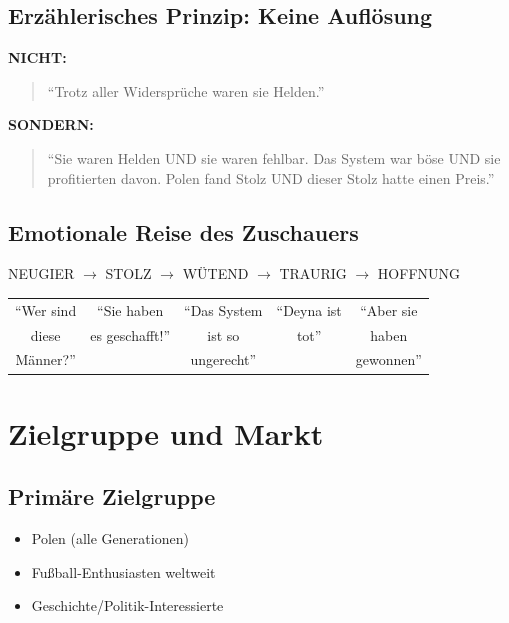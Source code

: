 \documentclass[11pt,a4paper]{book}
\begin{document}
\section{Erzählerisches Prinzip: Keine Auflösung}

\textbf{NICHT:}
\begin{quote}
``Trotz aller Widersprüche waren sie Helden.''
\end{quote}

\textbf{SONDERN:}
\begin{quote}
``Sie waren Helden UND sie waren fehlbar. Das System war böse UND sie profitierten davon. Polen fand Stolz UND dieser Stolz hatte einen Preis.''
\end{quote}

\section{Emotionale Reise des Zuschauers}

\begin{center}
NEUGIER $\rightarrow$ STOLZ $\rightarrow$ WÜTEND $\rightarrow$ TRAURIG $\rightarrow$ HOFFNUNG

\vspace{0.3cm}

\begin{tabular}{ccccc}
``Wer sind & ``Sie haben & ``Das System & ``Deyna ist & ``Aber sie \\
diese & es geschafft!'' & ist so & tot'' & haben \\
Männer?'' & & ungerecht'' & & gewonnen'' \\
\end{tabular}
\end{center}


\chapter{Zielgruppe und Markt}

\section{Primäre Zielgruppe}

\begin{itemize}
    \item Polen (alle Generationen)
    \item Fußball-Enthusiasten weltweit
    \item Geschichte/Politik-Interessierte
\end{itemize}
\end{document}
